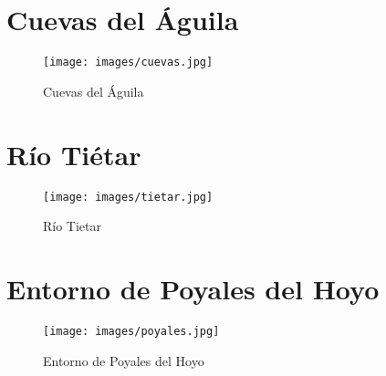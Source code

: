 \newpage
\section{Cuevas del Águila}
\label{sec:cuevas}

\begin{figure}[h]
  \begin{center}
    \texttt{[image: images/cuevas.jpg]}
    \caption{Cuevas del Águila}
    \label{fig:cuevas}
  \end{center}
\end{figure}

\newpage
\section{Río Tiétar}
\label{sec:tietar}

\begin{figure}[h]
  \begin{center}
    \texttt{[image: images/tietar.jpg]}
    \caption{Río Tietar}
    \label{fig:tietar}
  \end{center}
\end{figure}

\section{Entorno de Poyales del Hoyo}
\label{sec:poyales}
\begin{figure}[h]
  \begin{center}
    \texttt{[image: images/poyales.jpg]}
    \caption{Entorno de Poyales del Hoyo}
    \label{fig:poyales}
  \end{center}
\end{figure}

